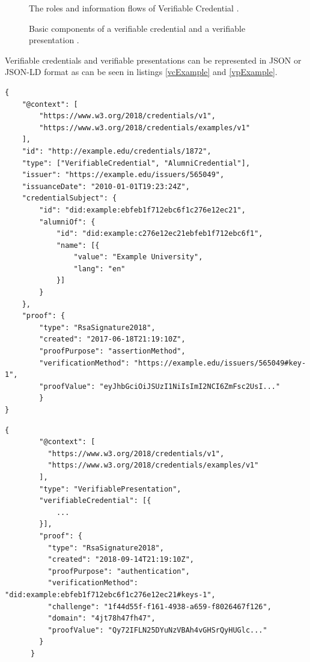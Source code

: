 \begin{figure}[h!]
    \centering
    
    \caption{The roles and information flows of Verifiable Credential \cite{vcW3C}.}
    \label{vcEcosystem}
\end{figure}

\begin{figure}[h!]
    \centering
     
    \hfil
    
    \caption{Basic components of a verifiable credential and a verifiable presentation \cite{vcW3C}.}
    \label{vc-vp-topview}
\end{figure}

Verifiable credentials and verifiable presentations can be represented in JSON \cite{json-rfc3986} or JSON-LD \cite{json-ld} format as can be seen in listings \ref{vcExample} and \ref{vpExample}. 

\begin{lstlisting}[caption={A simple example of a verifiable credential \cite{vcW3C}.},captionpos=b,style=json, label={vcExample},breaklines=true,frame=single]
{
    "@context": [
        "https://www.w3.org/2018/credentials/v1",
        "https://www.w3.org/2018/credentials/examples/v1"
    ],
    "id": "http://example.edu/credentials/1872",
    "type": ["VerifiableCredential", "AlumniCredential"],
    "issuer": "https://example.edu/issuers/565049",
    "issuanceDate": "2010-01-01T19:23:24Z",
    "credentialSubject": {
        "id": "did:example:ebfeb1f712ebc6f1c276e12ec21",
        "alumniOf": {
            "id": "did:example:c276e12ec21ebfeb1f712ebc6f1",
            "name": [{
                "value": "Example University",
                "lang": "en"
            }]
        }
    },    
    "proof": {
        "type": "RsaSignature2018",
        "created": "2017-06-18T21:19:10Z",
        "proofPurpose": "assertionMethod",
        "verificationMethod": "https://example.edu/issuers/565049#key-1",
        "proofValue": "eyJhbGciOiJSUzI1NiIsImI2NCI6ZmFsc2UsI..."
        }
}
\end{lstlisting}

\begin{lstlisting}[caption={A simple example of a verifiable presentation \cite{vcW3C}.},captionpos=b,style=json, label={vpExample},breaklines=true,frame=single]
    {
        "@context": [
          "https://www.w3.org/2018/credentials/v1",
          "https://www.w3.org/2018/credentials/examples/v1"
        ],
        "type": "VerifiablePresentation",
        "verifiableCredential": [{
            ...
        }],
        "proof": {
          "type": "RsaSignature2018",
          "created": "2018-09-14T21:19:10Z",
          "proofPurpose": "authentication",
          "verificationMethod": "did:example:ebfeb1f712ebc6f1c276e12ec21#keys-1",
          "challenge": "1f44d55f-f161-4938-a659-f8026467f126",
          "domain": "4jt78h47fh47",
          "proofValue": "Qy72IFLN25DYuNzVBAh4vGHSrQyHUGlc..."
        }
      }   
\end{lstlisting}

